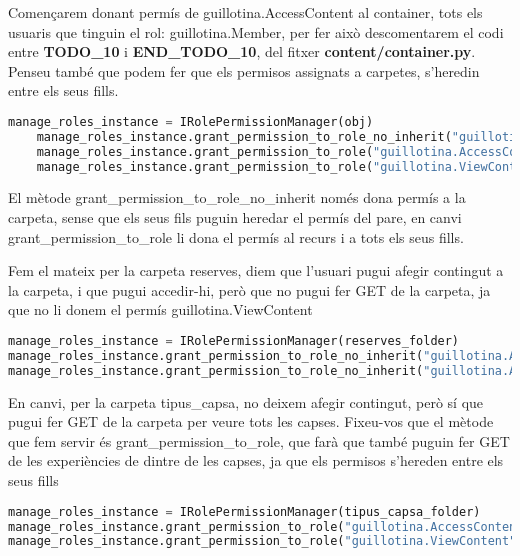 \documentclass[a4paper, 11pt]{article}
\begin{document}
Començarem donant permís de guillotina.AccessContent al container,
tots els usuaris que tinguin el rol: guillotina.Member, per fer això
descomentarem el codi entre \textbf{TODO\_10} i
\textbf{END\_TODO\_10}, del fitxer
\textbf{content/container.py}. Penseu també que podem fer que els
permisos assignats a carpetes, s'heredin entre els seus fills.

\begin{lstlisting}[language=Python, caption=Permisos container]
 manage_roles_instance = IRolePermissionManager(obj)
    manage_roles_instance.grant_permission_to_role_no_inherit("guillotina.AccessContent", "guillotina.Member")
    manage_roles_instance.grant_permission_to_role("guillotina.AccessContent", "guillotina.Editor")
    manage_roles_instance.grant_permission_to_role("guillotina.ViewContent", "guillotina.Editor")
  \end{lstlisting}

  El mètode grant\_permission\_to\_role\_no\_inherit només dona permís
  a la carpeta, sense que els seus fils puguin heredar el permís del
  pare, en canvi grant\_permission\_to\_role li dona el permís al
  recurs i a tots els seus fills.

  Fem el mateix per la carpeta reserves, diem que l'usuari pugui
  afegir contingut a la carpeta, i que pugui accedir-hi, però que no pugui fer GET de la carpeta, ja que no li donem el permís guillotina.ViewContent
\begin{lstlisting}[language=Python, caption=Permisos reserves]
manage_roles_instance = IRolePermissionManager(reserves_folder)
manage_roles_instance.grant_permission_to_role_no_inherit("guillotina.AccessContent", "guillotina.Member")
manage_roles_instance.grant_permission_to_role_no_inherit("guillotina.AddContent", "guillotina.Member")
\end{lstlisting}


En canvi, per la carpeta tipus\_capsa, no deixem afegir contingut,
però sí que pugui fer GET de la carpeta per veure tots les
capses. Fixeu-vos que el mètode que fem servir és
grant\_permission\_to\_role, que farà que també puguin fer GET de les
experiències de dintre de les capses, ja que els permisos s'hereden
entre els seus fills


\begin{lstlisting}[language=Python, caption=Permisos tipus\_capsa]
manage_roles_instance = IRolePermissionManager(tipus_capsa_folder)
manage_roles_instance.grant_permission_to_role("guillotina.AccessContent", "guillotina.Member")
manage_roles_instance.grant_permission_to_role("guillotina.ViewContent", "guillotina.Member")
\end{lstlisting}
\end{document}
